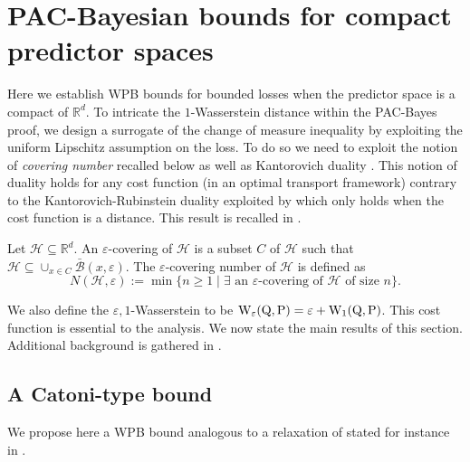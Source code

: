 \section{PAC-Bayesian bounds for compact predictor spaces}
\label{sec: compact_space}

Here we establish WPB bounds for bounded losses when the predictor space is a compact of $\mathbb{R}^d$. To intricate the $1$-Wasserstein distance within the PAC-Bayes proof, we design a surrogate of the change of measure inequality \citep{donsker1976asymp} by exploiting the uniform Lipschitz assumption on the loss. To do so we need to exploit the notion of \emph{covering number} recalled below as well as Kantorovich duality \citep[Theorem 5.10]{villani2009optimal}.
This notion of duality holds for any cost function (in an optimal transport framework) contrary to the Kantorovich-Rubinstein duality exploited by \citet{amit2022integral} which only holds when the cost function is a distance. This result is recalled in .
\begin{definition}
Let $\mathcal{H}\subseteq \mathbb{R}^d$. An $\varepsilon$-covering of $\mathcal{H}$ is a subset $C$ of $\mathcal{H}$ such that $\mathcal{H} \subseteq \cup_{x\in C} \bar{\mathcal{B}}(x,\varepsilon)$. The $\varepsilon$-covering number of $\mathcal{H}$ is defined as
$$N(\mathcal{H},\varepsilon):= \min\{n\geq 1 \mid \exists \text{ an $\varepsilon$-covering of $\mathcal{H}$ of size $n$} \}.$$
\end{definition}
We also define the $\varepsilon,1$-Wasserstein to be $\mathrm{W}_{\varepsilon}(\mathrm{Q},\mathrm{P})= \varepsilon + \mathrm{W}_{1}(\mathrm{Q},\mathrm{P})$. This cost function is essential to the analysis.
We now state the main results of this section. Additional background is gathered in .

\subsection{A Catoni-type bound}

We propose here a WPB bound analogous to a relaxation of \citet[Theorem 1.2.6]{catoni2007pac} stated for instance in \citet[Theorem 4.1]{alquier2016properties}.

